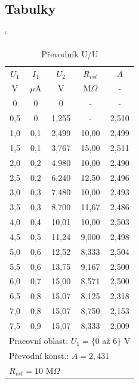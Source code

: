 \documentclass[a4paper, czech]{article}
\begin{document}
\subsection{Tabulky}

\begin{minipage}{0.48\textwidth}
    \begin{table}[H]
        \catcode`
        \centering
        \caption{Převodník U/U}
        \begin{tabular}{ccccc}
            \toprule
            $U_1$  & $I_1$  & $U_2$    & $R_{vst}$  & $A$     \\
            \cmidrule(rl){1-1}
            \cmidrule(rl){2-2}
            \cmidrule(rl){3-3}
            \cmidrule(rl){4-4}
            \cmidrule(rl){5-5}
            V   & $\mu$A  & V     & M$\Omega$    & -     \\
            \midrule
            0   & 0   & 0     & -     & -     \\
            0,5 & 0   & 1,255 & -     & 2,510 \\
            1,0 & 0,1 & 2,499 & 10,00 & 2,499 \\
            1,5 & 0,1 & 3,767 & 15,00 & 2,511 \\
            2,0 & 0,2 & 4,980 & 10,00 & 2,490 \\
            2,5 & 0,2 & 6,240 & 12,50 & 2,496 \\
            3,0 & 0,3 & 7,480 & 10,00 & 2,493 \\
            3,5 & 0,3 & 8,700 & 11,67 & 2,486 \\
            4,0 & 0,4 & 10,01 & 10,00 & 2,503 \\
            4,5 & 0,5 & 11,24 & 9,000 & 2,498 \\
            5,0 & 0,6 & 12,52 & 8,333 & 2,504 \\
            5,5 & 0,6 & 13,75 & 9,167 & 2,500 \\
            6,0 & 0,7 & 15,00 & 8,571 & 2,500 \\
            6,5 & 0,8 & 15,07 & 8,125 & 2,318 \\
            7,0 & 0,8 & 15,07 & 8,750 & 2,153 \\
            7,5 & 0,9 & 15,07 & 8,333 & 2,009 \\
            \bottomrule
            \multicolumn{5}{l}{Pracovní oblast: $U_1 = \{0$ až $6\}$ V} \\
            \multicolumn{5}{l}{Převodní konst.: $A = 2,431$} \\
            \multicolumn{5}{l}{$R_{vst} = 10$ M$\Omega$} \\
        \end{tabular}
    \end{table}
\end{minipage}
\end{document}
